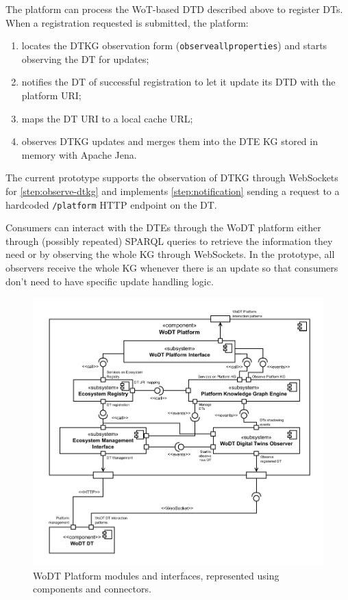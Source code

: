 The platform can process the \ac{WoT}-based \ac{DTD} described above to register \acp{DT}.
When a registration requested is submitted, the platform:
\begin{enumerate}[label=\textbf{Step \arabic*}, leftmargin=5.3em]
    \item locates the \ac{DTKG} observation form (\texttt{observeallproperties}) and starts observing the \ac{DT} for updates;\label{step:observe-dtkg}
    \item notifies the \ac{DT} of successful registration to let it update its \ac{DTD} with the platform URI;\label{step:notification}
    \item maps the \ac{DT} \ac{URI} to a local cache URL;
    \item observes \ac{DTKG} updates and merges them into the \ac{DTE} \ac{KG} stored in memory with Apache Jena.
\end{enumerate}

%
The current prototype supports the observation of \ac{DTKG} through WebSockets for \ref{step:observe-dtkg} and implements \ref{step:notification} sending a request to a hardcoded \texttt{/platform} HTTP endpoint on the \ac{DT}.

Consumers can interact with the \acp{DTE} through the \ac{WoDT} platform
either through (possibly repeated) SPARQL queries to retrieve the information they need or by observing the whole \ac{KG} through WebSockets.
%
In the prototype, all observers receive the whole \ac{KG} whenever there is an update so that consumers don't need to have specific update handling logic.
%

\begin{figure}
  \centering
  \includegraphics[width=\columnwidth]{figures/hwodt/platform-c&c.pdf}
  \caption{\ac{WoDT} Platform modules and interfaces, represented using components and connectors.}
  \label{fig:platform-c&c}
\end{figure}


